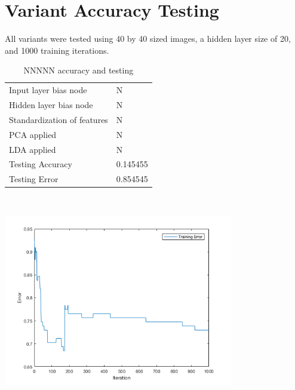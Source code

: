 \documentclass[12pt]{article}
\newcommand{\accuracyAndTestErrorTable}[8]{
  \begin{tabular}{l|l}
    \hline
    Input layer bias node & #1 \\
    Hidden layer bias node & #2 \\
    Standardization of features & #3 \\
    PCA applied & #4 \\
    LDA applied & #5 \\
    \hline
    Testing Accuracy & #6 \\
    Testing Error & #7 \\
    \hline
  \end{tabular}
  ~\\[60pt]
  \caption{#8}
}
\begin{document}
\section{Variant Accuracy Testing}
All variants were tested using 40 by 40 sized images, a hidden layer size of 20, and 1000 training iterations.
\begin{center}
  \begin{table}[H]
    \begin{varwidth}[b]{0.4\linewidth}
      \centering
      \accuracyAndTestErrorTable{N}{N}{N}{N}{N}{0.145455}{0.854545}{NNNNN accuracy and testing}
      \label{table:NNNNN}
    \end{varwidth}%
    \hfill
    \begin{minipage}[b]{0.6\linewidth}
      \centering
      \includegraphics[width=100mm]{NNNNN_training_error.png}
      \label{fig:NNNNN}
    \end{minipage}
  \end{table}
\end{center}
\end{document}
